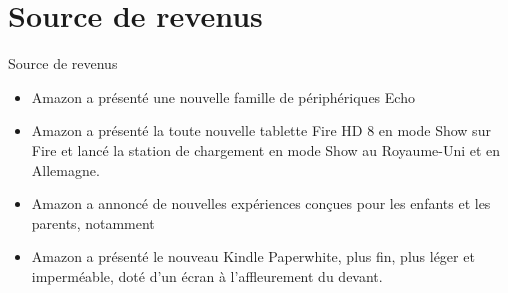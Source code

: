 \section[Source de revenus]{Source de revenus}
\begin{frame}{Source de revenus}
    \begin{itemize}
       \item Amazon a présenté une nouvelle famille de périphériques Echo
       \item Amazon a présenté la toute nouvelle tablette Fire HD 8 en mode Show sur Fire et lancé la station de chargement en mode Show au Royaume-Uni et en Allemagne.
       \item Amazon a annoncé de nouvelles expériences conçues pour les enfants et les parents, notamment
       \item Amazon a présenté le nouveau Kindle Paperwhite, plus fin, plus léger et imperméable, doté d’un écran à l’affleurement du devant.
    \end{itemize}
\end{frame}

\begin{frame}
\end{frame}